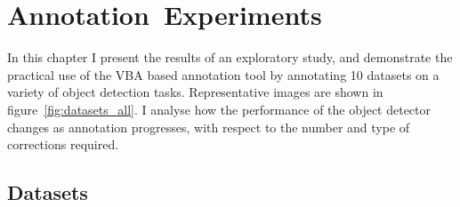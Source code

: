 \chapter{Annotation~Experiments}
\label{chap:annotation} 

In this chapter I present the results of an exploratory study, and demonstrate the practical use of the \gls{VBA} based annotation tool by annotating 10 datasets on a variety of object detection tasks.  Representative images are shown in figure~\ref{fig:datasets_all}. I analyse how the performance of the object detector changes as annotation progresses, with respect to the number and type of corrections required.

\section{Datasets}

